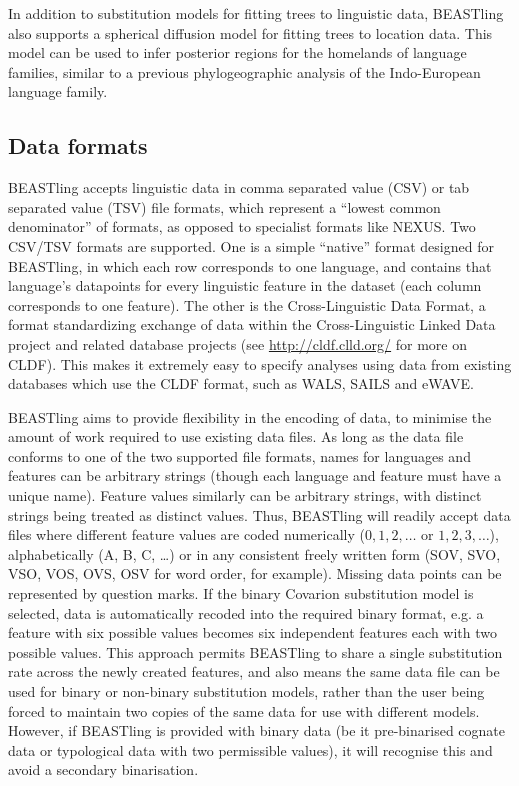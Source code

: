 \documentclass[twocolumn,10pt]{scrartcl}
\begin{document}
In addition to substitution models for fitting trees to linguistic data, BEASTling also supports a spherical diffusion model\cite{Bouckaert2016} for fitting trees to location data.  This model can be used to infer posterior regions for the homelands of language families, similar to a previous phylogeographic analysis of the Indo-European language family\cite{Bouckaert2012}.

\subsection{Data formats}

BEASTling accepts linguistic data in comma separated value (CSV) or tab separated value (TSV) file formats, which represent a ``lowest common denominator'' of formats, as opposed to specialist formats like NEXUS.  Two CSV/TSV formats are supported.  One is a simple ``native'' format designed for BEASTling, in which each row corresponds to one language, and contains that language's datapoints for every linguistic feature in the dataset (each column corresponds to one feature).  The other is the Cross-Linguistic Data Format\cite{Forkel2016}, a format standardizing exchange of data within the Cross-Linguistic Linked Data project and related database projects (see \url{http://cldf.clld.org/} for more on CLDF).  This makes it extremely easy to specify analyses using data from existing databases which use the CLDF format, such as WALS, SAILS and eWAVE\cite{Kortmann2013}.

BEASTling aims to provide flexibility in the encoding of data, to minimise the amount of work required to use existing data files.  As long as the data file conforms to one of the two supported file formats, names for languages and features can be arbitrary strings (though each language and feature must have a unique name).  Feature values similarly can be arbitrary strings, with distinct strings being treated as distinct values.  Thus, BEASTling will readily accept data files where different feature values are coded numerically ($0, 1, 2,\ldots$ or $1, 2, 3,\ldots$), alphabetically (A, B, C, \ldots) or in any consistent freely written form (SOV, SVO, VSO, VOS, OVS, OSV for word order, for example).  Missing data points can be represented by question marks.  If the binary Covarion substitution model is selected, data is automatically recoded into the required binary format, e.g. a feature with six possible values becomes six independent features each with two possible values.  This approach permits BEASTling to share a single substitution rate across the newly created features, and also means the same data file can be used for binary or non-binary substitution models, rather than the user being forced to maintain two copies of the same data for use with different models.  However, if BEASTling is provided with binary data (be it pre-binarised cognate data or typological data with two permissible values), it will recognise this and avoid a secondary binarisation.
\end{document}
